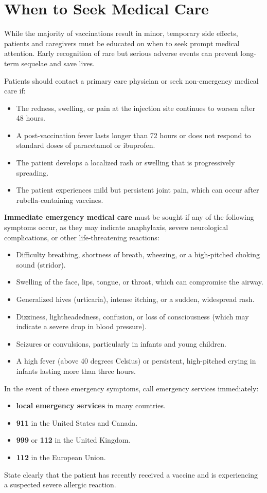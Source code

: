 \section*{When to Seek Medical Care}
While the majority of vaccinations result in minor, temporary side effects, patients and caregivers must be educated on when to seek prompt medical attention. Early recognition of rare but serious adverse events can prevent long-term sequelae and save lives.

Patients should contact a primary care physician or seek non-emergency medical care if:
\begin{itemize}
    \item The redness, swelling, or pain at the injection site continues to worsen after 48 hours.
    \item A post-vaccination fever lasts longer than 72 hours or does not respond to standard doses of paracetamol or ibuprofen.
    \item The patient develops a localized rash or swelling that is progressively spreading.
    \item The patient experiences mild but persistent joint pain, which can occur after rubella-containing vaccines.
\end{itemize}

\textbf{Immediate emergency medical care} must be sought if any of the following symptoms occur, as they may indicate anaphylaxis, severe neurological complications, or other life-threatening reactions:
\begin{itemize}
    \item Difficulty breathing, shortness of breath, wheezing, or a high-pitched choking sound (stridor).
    \item Swelling of the face, lips, tongue, or throat, which can compromise the airway.
    \item Generalized hives (urticaria), intense itching, or a sudden, widespread rash.
    \item Dizziness, lightheadedness, confusion, or loss of consciousness (which may indicate a severe drop in blood pressure).
    \item Seizures or convulsions, particularly in infants and young children.
    \item A high fever (above 40 degrees Celsius) or persistent, high-pitched crying in infants lasting more than three hours.
\end{itemize}

In the event of these emergency symptoms, call emergency services immediately:
\begin{itemize}
    \item \textbf{local emergency services} in many countries.
    \item \textbf{911} in the United States and Canada.
    \item \textbf{999} or \textbf{112} in the United Kingdom.
    \item \textbf{112} in the European Union.
\end{itemize}
State clearly that the patient has recently received a vaccine and is experiencing a suspected severe allergic reaction.

